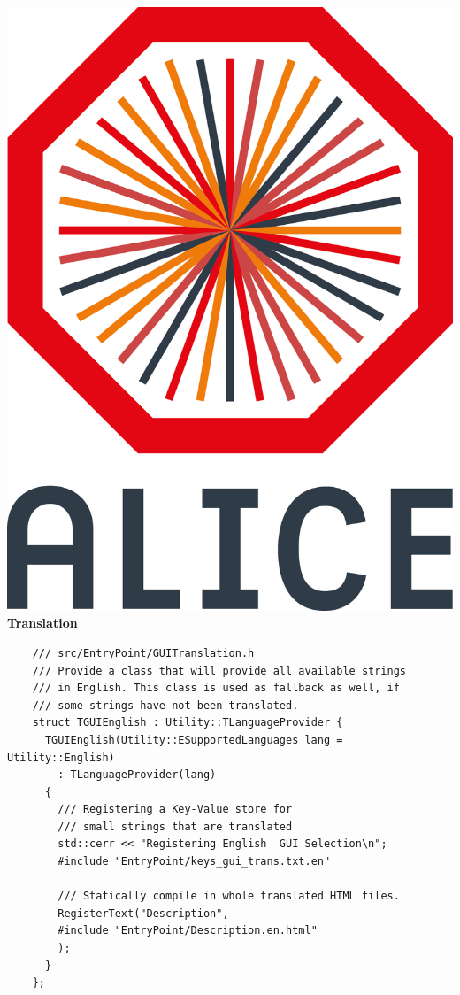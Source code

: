 \documentclass[aspectratio=1610,14pt,dvipsnames]{beamer}
\begin{document}
\begin{frame}[fragile]{\includegraphics[height=0.07\textheight]{2012-Jul-04-4_Color_Logo_CB.png} \hspace{0.2cm}\textbf{Translation}}
  \begin{verbatim}
    /// src/EntryPoint/GUITranslation.h
    /// Provide a class that will provide all available strings
    /// in English. This class is used as fallback as well, if
    /// some strings have not been translated.
    struct TGUIEnglish : Utility::TLanguageProvider {
      TGUIEnglish(Utility::ESupportedLanguages lang = Utility::English)
        : TLanguageProvider(lang)
      {
        /// Registering a Key-Value store for
        /// small strings that are translated
        std::cerr << "Registering English  GUI Selection\n";
        #include "EntryPoint/keys_gui_trans.txt.en"

        /// Statically compile in whole translated HTML files.
        RegisterText("Description",
        #include "EntryPoint/Description.en.html"
        );
      }
    };
  \end{verbatim}
\end{frame}
\end{document}
